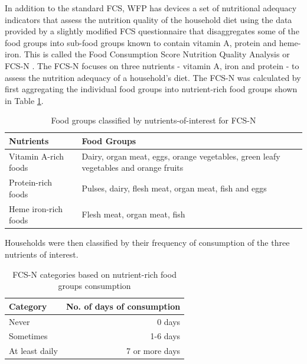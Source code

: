 \documentclass[12pt,a4paper]{article}
\begin{document}
In addition to the standard FCS, WFP has devices a set of nutritional adequacy indicators that assess the nutrition quality of the household diet using the data provided by a slightly modified FCS questionnaire that disaggregates some of the food groups into sub-food groups known to contain vitamin A, protein and heme-iron. This is called the Food Consumption Score Nutrition Quality Analysis or FCS-N \citep{WorldFoodProgramme:2015tn}. The FCS-N focuses on three nutrients - vitamin A, iron and protein - to assess the nutrition adequacy of a household's diet. The FCS-N was calculated by first aggregating the individual food groups into nutrient-rich food groups shown in Table \ref{tab:fcs3}.

\begin{table}[H]

\caption{\label{tab:fcs3}Food groups classified by nutrients-of-interest for FCS-N}
\centering
\begin{tabular}[t]{l>{\raggedright\arraybackslash}p{8cm}}
\toprule
\textbf{Nutrients} & \textbf{Food Groups}\\
\midrule
\rowcolor{gray!6}  Vitamin A-rich foods & Dairy, organ meat, eggs, orange vegetables, green leafy vegetables and orange fruits\\
Protein-rich foods & Pulses, dairy, flesh meat, organ meat, fish and eggs\\
\rowcolor{gray!6}  Heme iron-rich foods & Flesh meat, organ meat, fish\\
\bottomrule
\end{tabular}
\end{table}

Households were then classified by their frequency of consumption of the three nutrients of interest.

\begin{table}[H]

\caption{\label{tab:fcs4}FCS-N categories based on nutrient-rich food groups consumption}
\centering
\begin{tabular}[t]{lr}
\toprule
\textbf{Category} & \textbf{No. of days of consumption}\\
\midrule
\rowcolor{gray!6}  Never & 0 days\\
Sometimes & 1-6 days\\
\rowcolor{gray!6}  At least daily & 7 or more days\\
\bottomrule
\end{tabular}
\end{table}
\end{document}
